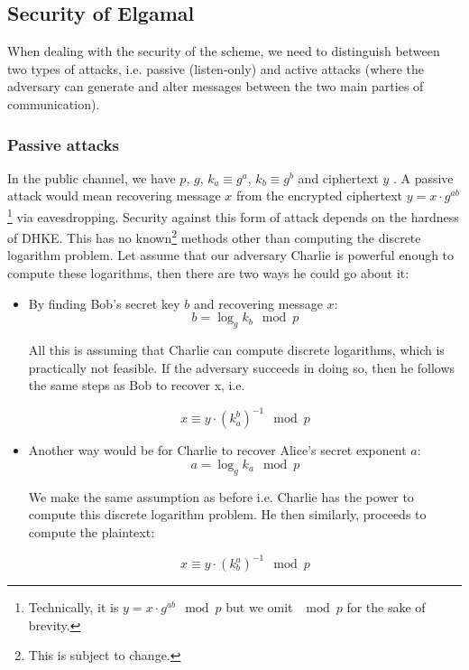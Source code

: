 \subsection{Security of Elgamal}

When dealing with the security of the scheme, we need to distinguish between two types of attacks, i.e. passive (listen-only) and active attacks (where the adversary can generate and alter messages between the two main parties of communication).

\subsubsection{Passive attacks}

In the public channel, we have \( p \), \( g \), \( k_a \equiv g^a \), \( k_b \equiv g^b \) and ciphertext \( y \) . A passive attack would mean recovering message \( x \) from the encrypted ciphertext \( y = x \cdot g^{ab} \)\textsuperscript{   }\footnote{Technically, it is \( y = x \cdot g^{ab} \mod p \) but we omit \( \mod p \) for the sake of brevity.} via eavesdropping.
Security against this form of attack depends on the hardness of DHKE. 
This has no known\footnote{This is subject to change.} methods other than computing the discrete logarithm problem.
Let assume that our adversary Charlie is powerful enough to compute these logarithms, then there are two ways he could go about it:

\begin{itemize}
    \item By finding Bob's secret key \( b \) and recovering message \( x \):
        \begin{equation}
            b = \log_g k_b \mod p
        \end{equation}

        All this is assuming that Charlie can compute discrete logarithms, which is practically not feasible. 
        If the adversary succeeds in doing so, then he follows the same steps as Bob to recover x, i.e.

        \begin{equation}
            x \equiv y \cdot (k_a^b)^{-1} \mod p
        \end{equation}
        
    \item Another way would be for Charlie to recover Alice's secret exponent \( a \):
        \begin{equation}
            a = \log_g k_a \mod p
        \end{equation}
        
        We make the same assumption as before i.e. Charlie has the power to compute this discrete logarithm problem.
        He then similarly, proceeds to compute the plaintext:

        \begin{equation}
            x \equiv y \cdot (k_b^a)^{-1} \mod p     
        \end{equation}
\end{itemize}

